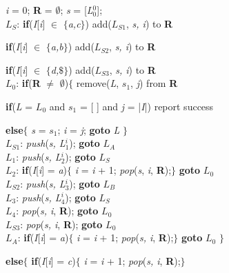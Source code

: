 \hspace{0.2cm}\textit{i} = 0; \textbf{R} = $\emptyset$; \textit{s} = [\textit{L$_0^{0}$}];\\
$L_S$: \textbf{if}(\textit{I}[\textit{i}] $\in$ $\{$\textit{a,c}$\}$) add($L_{S1}$, \textit{s, i}) to \textbf{R} \par
\hspace{0.2cm}\textbf{if}(\textit{I}[\textit{i}] $\in$ $\{$\textit{a,b}$\}$) add(\textit{$L_{S2}$}, \textit{s, i}) to \textbf{R}\par
\hspace{0.2cm}\textbf{if}(\textit{I}[\textit{i}] $\in$ $\{$\textit{d,$\$$}$\}$) add(\textit{$L_{S3}$}, \textit{s, i}) to \textbf{R} \\
$L_0$: \textbf{if}(\textbf{R} $\ne$ $\emptyset$)$\{$ remove(\textit{L}, $s_1$, \textit{j}) from \textbf{R} \par
\hspace{2.2cm}\textbf{if}(\textit{L} = $L_0$ and $s_1$ = [ ] and \textit{j} = |\textit{I}|) report success \par
\hspace{2.2cm}\textbf{else}$\{$ \textit{s} = $s_1$; \textit{i} = \textit{j}; \textbf{goto} \textit{L} $\}$ \\
$L_{S1}$: \textit{push}(\textit{s, L$_1^{i}$}); \textbf{goto} $L_A$\\
$L_1$:  \textit{push}(\textit{s, L$_2^{i}$}); \textbf{goto} $L_S$\\
$L_2$:  \textbf{if}(\textit{I}[\textit{i}] = \textit{a})$\{$ \textit{i} = \textit{i} + 1; \textit{pop}(\textit{s}, \textit{i}, \textbf{R});$\}$ \textbf{goto} $L_0$ \\
$L_{S2}$: \textit{push}(\textit{s, L$_3^{i}$}); \textbf{goto} $L_B$\\
$L_3$:  \textit{push}(\textit{s, L$_4^{i}$}); \textbf{goto} $L_S$\\
$L_4$: \textit{pop}(\textit{s, i}, \textbf{R}); \textbf{goto} $L_0$ \\
$L_{S3}$: \textit{pop}(\textit{s, i}, \textbf{R}); \textbf{goto} $L_0$ \\
$L_A$:  \textbf{if}(\textit{I}[\textit{i}] = \textit{a})$\{$ \textit{i} = \textit{i} + 1; \textit{pop}(\textit{s, i}, \textbf{R});$\}$ \textbf{goto} $L_0$ $\}$ \par
\hspace{0.2cm} \textbf{else}$\{$ \textbf{if}(\textit{I}[\textit{i}] = \textit{c})$\{$ \textit{i} = \textit{i} + 1; \textit{pop}(\textit{s, i}, \textbf{R});$\}$ \par 
